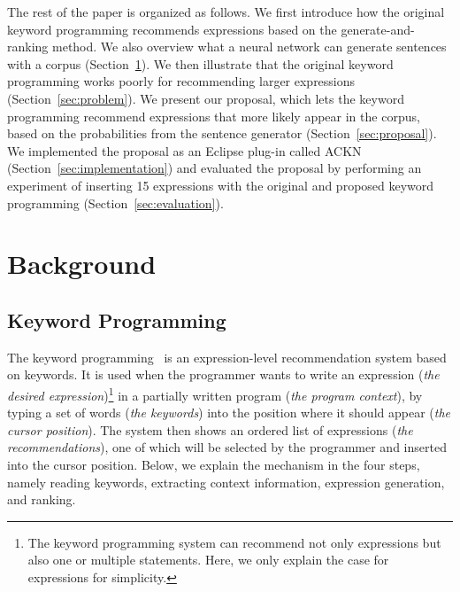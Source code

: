 \documentclass[PRO,english]{ipsj}
\newcommand{\secref}[1]{Section~\ref{#1}}
\begin{document}
The rest of the paper is organized as follows.  We first introduce how the original keyword programming recommends expressions based on the generate-and-ranking method.  We also overview what a neural network can generate sentences with a corpus (\secref{sec:background}).  We then illustrate that the original keyword programming works poorly for recommending larger expressions (\secref{sec:problem}).  We present our proposal, which lets the keyword programming recommend expressions that more likely appear in the corpus, based on the probabilities from the sentence generator (\secref{sec:proposal}).  We implemented the proposal as an Eclipse plug-in called ACKN (\secref{sec:implementation}) and evaluated the proposal by performing an experiment of inserting 15 expressions with the original and proposed keyword programming (\secref{sec:evaluation}). 



\section{Background}\label{sec:background}
\subsection{Keyword Programming}
The keyword programming~\cite{little2009keyword} is an expression-level recommendation system based on keywords.  It is used when the programmer wants to write an expression (\emph{the desired expression})\footnote{The keyword programming system can recommend not only expressions but also one or multiple statements.  Here, we only explain the case for expressions for simplicity.} in a partially written program (\emph{the program context}), by typing a set of words (\emph{the keywords}) into the position where it should appear (\emph{the cursor position}).  The system then shows an ordered list of expressions (\emph{the recommendations}), one of which will be selected by the programmer and inserted into the cursor position. Below, we explain the mechanism in the four steps, namely reading keywords, extracting context information, expression generation, and ranking. 
\end{document}
